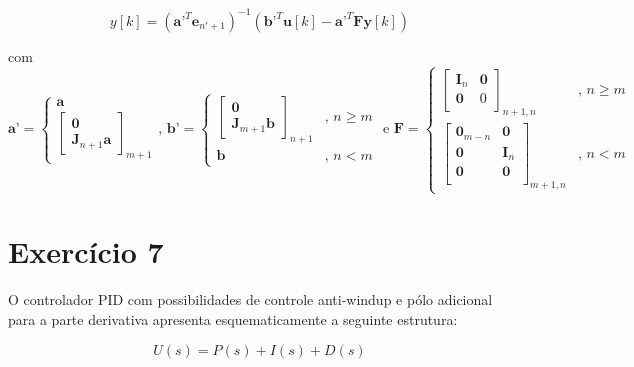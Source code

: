 \documentclass[twoside, fleqn]{article}
\begin{document}
        \begin{equation}
            y[k] = (\textbf{a'}^T \textbf{e}_{n' + 1})^{-1}(\textbf{b'}^T \textbf{u}[k] - \textbf{a'}^T \textbf{F} \textbf{y}[k])
            \label{eq:u_programacao}
        \end{equation}
    
    com $\textbf{a'} = \begin{cases} \textbf{a}\\ \begin{bmatrix} \textbf{0} \\ \textbf{J}_{n+1} \textbf{a} \end{bmatrix}_{m+1} \end{cases} \mbox{, } \textbf{b'} = \begin{cases} \begin{bmatrix} \textbf{0}\\ \textbf{J}_{m+1} \textbf{b} \end{bmatrix}_{n+1} &\mbox{, } n \geq m \\ \textbf{b} &\mbox{, } n < m \end{cases} \mbox{ e } \textbf{F} = \begin{cases}\begin{bmatrix} \textbf{I}_{n} & \textbf{0} \\ \textbf{0} & 0 \\ \end{bmatrix}_{n+1, n} &\mbox{, } n \geq m \\ \begin{bmatrix} \textbf{0}_{m-n} & \textbf{0} \\ \textbf{0} & \textbf{I}_{n} \\ \textbf{0} & \textbf{0} \\ \end{bmatrix}_{m+1, n} & \mbox{, } n < m \end{cases}$

\section*{Exercício 7}

    O controlador PID com possibilidades de controle anti-windup e pólo adicional para a parte derivativa apresenta esquematicamente a seguinte estrutura:
    
        \begin{equation}
            U(s) = P(s) + I(s) + D(s)
            \label{eq:PID}
        \end{equation}
    
\end{document}
